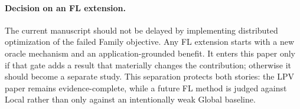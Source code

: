 \paragraph{Decision on an FL extension.}
The current manuscript should not be delayed by implementing distributed
optimization of the failed Family objective. Any FL extension starts with a new
oracle mechanism and an application-grounded benefit. It enters this paper only
if that gate adds a result that materially changes the contribution; otherwise
it should become a separate study. This separation protects both stories: the
LPV paper remains evidence-complete, while a future FL method is judged against
Local rather than only against an intentionally weak Global baseline.
